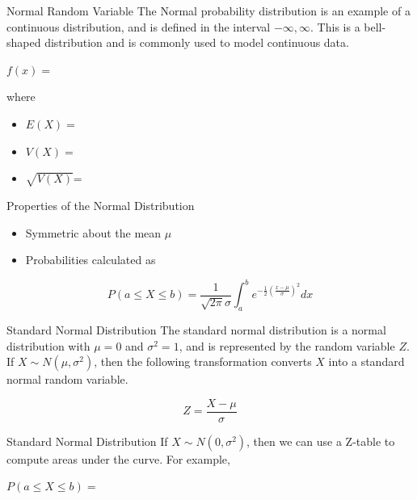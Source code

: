 \documentclass[
  ignorenonframetext,
]{beamer}
\providecommand{\tightlist}{%
  \setlength{\itemsep}{0pt}\setlength{\parskip}{0pt}}
\begin{document}
\begin{frame}{Normal Random Variable}
\protect{}\label{normal-random-variable}
The Normal probability distribution is an example of a continuous
distribution, and is defined in the interval \(-\infty,\infty\). This is
a bell-shaped distribution and is commonly used to model continuous
data.

\(f(x)=\)

where

\begin{itemize}
\tightlist
\item
  \(E(X)=\)
\end{itemize}

\hfill\break

\begin{itemize}
\tightlist
\item
  \(V(X)=\)
\end{itemize}

\hfill\break

\begin{itemize}
\tightlist
\item
  \(\sqrt{V(X)}\)=
\end{itemize}
\end{frame}

\begin{frame}{Properties of the Normal Distribution}
\protect{}\label{properties-of-the-normal-distribution}
\begin{itemize}
\tightlist
\item
  Symmetric about the mean \(\mu\)
\item
  Probabilities calculated as
\end{itemize}

\[
P(a \leq X \leq b) = \frac{1}{\sqrt{2\pi}\sigma}\int_a^b e^{-\frac{1}{2}(\frac{x-\mu}{\sigma})^2} dx
\]
\end{frame}

\begin{frame}{Standard Normal Distribution}
\protect{}\label{standard-normal-distribution}
The standard normal distribution is a normal distribution with \(\mu=0\)
and \(\sigma^2=1\), and is represented by the random variable \(Z\). If
\(X\sim N(\mu,\sigma^2)\), then the following transformation converts
\(X\) into a standard normal random variable.

\[
Z=\frac{X-\mu}{\sigma}
\]
\end{frame}

\begin{frame}{Standard Normal Distribution}
\protect{}\label{standard-normal-distribution-1}
If \(X\sim N(0,\sigma^2)\), then we can use a Z-table to compute areas
under the curve. For example,

\(P(a\leq X\leq b)=\)
\end{frame}
\end{document}
